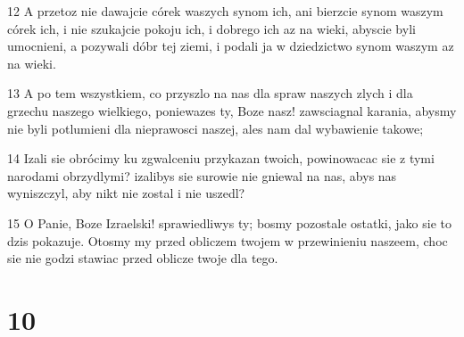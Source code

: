 \par 12 A przetoz nie dawajcie córek waszych synom ich, ani bierzcie synom waszym córek ich, i nie szukajcie pokoju ich, i dobrego ich az na wieki, abyscie byli umocnieni, a pozywali dóbr tej ziemi, i podali ja w dziedzictwo synom waszym az na wieki.
\par 13 A po tem wszystkiem, co przyszlo na nas dla spraw naszych zlych i dla grzechu naszego wielkiego, poniewazes ty, Boze nasz! zawsciagnal karania, abysmy nie byli potlumieni dla nieprawosci naszej, ales nam dal wybawienie takowe;
\par 14 Izali sie obrócimy ku zgwalceniu przykazan twoich, powinowacac sie z tymi narodami obrzydlymi? izalibys sie surowie nie gniewal na nas, abys nas wyniszczyl, aby nikt nie zostal i nie uszedl?
\par 15 O Panie, Boze Izraelski! sprawiedliwys ty; bosmy pozostale ostatki, jako sie to dzis pokazuje. Otosmy my przed obliczem twojem w przewinieniu naszeem, choc sie nie godzi stawiac przed oblicze twoje dla tego.

\chapter{10}


